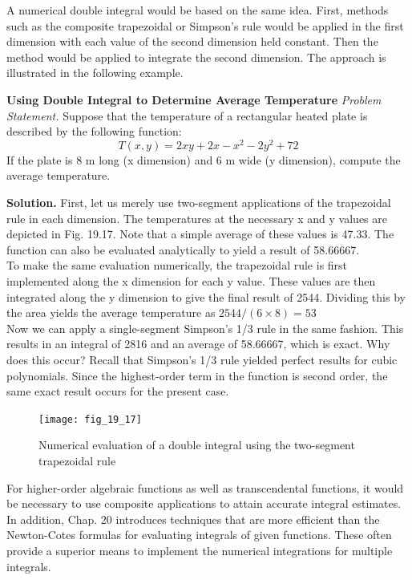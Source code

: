 \documentclass[../main.tex]{subfiles}
\begin{document}
A numerical double integral would be based on the same idea. First, methods such as
the composite trapezoidal or Simpson's rule would be applied in the first dimension with
each value of the second dimension held constant. Then the method would be applied to integrate the second dimension. The approach is illustrated in the following example.

\begin{exmp} \textbf{Using Double Integral to Determine Average Temperature}
    \noindent\textit{Problem Statement.} Suppose that the temperature of a rectangular heated plate is described by the following function:
	\begin{equation}
		T(x, y)=2 x y+2 x-x^{2}-2 y^{2}+72\nonumber
	\end{equation}
	If the plate is 8 m long (x dimension) and 6 m wide (y dimension), compute the average
temperature.
	
	\noindent \textbf{Solution.} First, let us merely use two-segment applications of the trapezoidal rule in each
	dimension. The temperatures at the necessary x and y values are depicted in Fig. 19.17.
	Note that a simple average of these values is 47.33. The function can also be evaluated analytically to yield a result of 58.66667.\\
	To make the same evaluation numerically, the trapezoidal rule is first implemented
along the x dimension for each y value. These values are then integrated along the y dimension to give the final result of 2544. Dividing this by the area yields the average temperature as $2544/(6\times8)=53$\\
Now we can apply a single-segment Simpson's 1/3 rule in the same fashion. This results
in an integral of 2816 and an average of 58.66667, which is exact. Why does this occur? Recall
that Simpson's 1/3 rule yielded perfect results for cubic polynomials. Since the highest-order
term in the function is second order, the same exact result occurs for the present case.

\begin{figure}[H]
    \centering
    \texttt{[image: fig\_19\_17]}
   \caption{\textsf{Numerical evaluation of a double integral using the two-segment trapezoidal rule}}\label{fig:fig_19_17}
\end{figure}

For higher-order algebraic functions as well as transcendental functions, it would be
necessary to use composite applications to attain accurate integral estimates. In addition,
Chap. 20 introduces techniques that are more efficient than the Newton-Cotes formulas for
evaluating integrals of given functions. These often provide a superior means to implement
the numerical integrations for multiple integrals.

\end{exmp}
\end{document}
